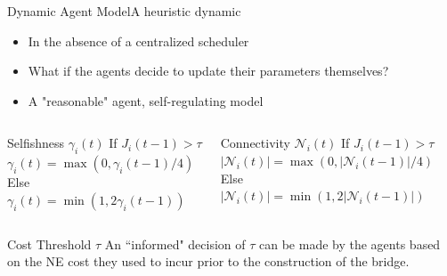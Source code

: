 \documentclass[aspectratio=169]{beamer}
\begin{document}
\begin{frame}{Dynamic Agent Model}{A heuristic dynamic}
\begin{itemize}
    \item In the absence of a centralized scheduler
    \item What if the agents decide to update their parameters themselves?
    \item A "reasonable" agent, self-regulating model 
\end{itemize}
\begin{columns}
        \begin{block}{Selfishness $\gamma_i(t)$}
            If $J_i(t-1) > \tau$\\
            \quad$\gamma_i(t) = \max(0,\gamma_i(t-1)/4)$\\
            Else\\
            \quad$\gamma_i(t) = \min(1,2\gamma_i(t-1))$\\
        \end{block}
        
        \begin{block}{Connectivity $\mathcal{N}_i(t)$}
            If $J_i(t-1) > \tau$\\
            \quad$|\mathcal{N}_i(t)| = \max(0,|\mathcal{N}_i(t-1)|/4)$\\
            Else\\
            \quad$|\mathcal{N}_i(t)| = \min(1,2|\mathcal{N}_i(t-1)|)$\\
        \end{block}
    \end{columns}
    \begin{block}{Cost Threshold $\tau$}
    An ``informed" decision of $\tau$ can be made by the agents based on the NE cost they used to incur prior to the construction of the bridge.
    \end{block}
\end{frame}
\end{document}
